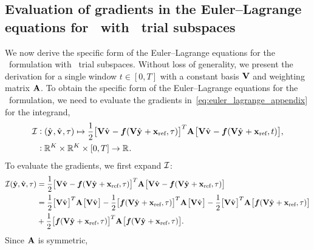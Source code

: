 \documentclass[3p,computermodern,10pt]{elsarticle}
\begin{document}
\begin{appendices}
\section{Evaluation of gradients in the Euler--Lagrange equations for \methodAcronym\ with \spatialAcronym\ trial subspaces}\label{appendix:vector_calc}
We now derive the specific form of the Euler--Lagrange equations for the \methodAcronym\ formulation with \spatialAcronym\ trial subspaces. Without loss of generality, we present the derivation for a single window $t \in [0,T]$ with a constant basis $\mathbf {V}$ and weighting matrix $\mathbf{A}$.  
To obtain the specific form of the Euler--Lagrange equations for the \methodAcronym\ formulation, we need to evaluate the gradients in~\eqref{eq:euler_lagrange_appendix} for the integrand,
\begin{align*}\label{eq:integrand_apx}
 \mathcal{I} & \vcentcolon
(\hat{\mathbf{y}}^{}, \hat{\mathbf{v}}^{} ,\tau) \mapsto \frac{1}{2} \big[
\mathbf {V} \hat{\mathbf{v}}^{} - \boldsymbol f(\mathbf {V} \hat{\mathbf{y}}^{}
+ \mathbf{x}_\text{ref},\tau) \big]^T \mathbf{A}^{} \big[
\mathbf {V} \hat{\mathbf{v}}^{}  - \boldsymbol f(\mathbf {V} \hat{\mathbf{y}}^{} +
\mathbf{x}_\text{ref},t) \big], \\ & 
\vcentcolon \mathbb{R}^{K} \times \mathbb{R}^{K} \times [0,T]
 \rightarrow \mathbb{R}^{} .  
\end{align*}
To evaluate the gradients, we first expand $\mathcal{I}$:
\begin{align*}
 \mathcal{I}(\hat{\mathbf{y}},\hat{\mathbf{v}},\tau)  &= \frac{1}{2} \big[ \mathbf {V} \hat{\mathbf{v}}^{}  - \boldsymbol f(\mathbf {V} \hat{\mathbf{y}}^{} + \mathbf{x}_\text{ref},\tau) \big]^T \mathbf{A}^{} \big[ \mathbf {V} \hat{\mathbf{v}}^{} - \boldsymbol f(\mathbf {V} \hat{\mathbf{y}}^{} + \mathbf{x}_\text{ref},\tau) \big] \\ 
 &= \frac{1}{2}\big[\mathbf {V} \hat{\mathbf{v}}^{}  \big]^T  \mathbf{A}^{}  \big[\mathbf {V} \hat{\mathbf{v}}^{} \big]  - \frac{1}{2}\big[ \boldsymbol f(\mathbf {V} \hat{\mathbf{y}}^{} + \mathbf{x}_\text{ref},\tau) \big]^T \mathbf{A}^{}  \big[\mathbf {V} \hat{\mathbf{v}}^{}\big] - \frac{1}{2} \big[ \mathbf {V} \hat{\mathbf{v}}^{} \big]^T \mathbf{A}^{} \big[ \boldsymbol f(\mathbf {V} \hat{\mathbf{y}}^{} + \mathbf{x}_\text{ref},\tau) \big]  \\ &+ \frac{1}{2}\big[\boldsymbol f(\mathbf {V} \hat{\mathbf{y}}^{} + \mathbf{x}_\text{ref},\tau) \big]^T \mathbf{A}^{} \big[ \boldsymbol f(\mathbf {V} \hat{\mathbf{y}}^{} + \mathbf{x}_\text{ref},\tau) \big].
\end{align*}
Since $\mathbf{A}$ is symmetric,
\begin{equation}\label{eq:int_expand}

\end{equation}
\end{appendices}
\end{document}
